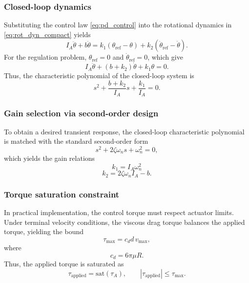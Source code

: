 \documentclass[journal]{IEEEtran}
\begin{document}
\subsubsection{Closed-loop dynamics}

Substituting the control law \eqref{eq:pd_control} into the rotational dynamics in \eqref{eq:rot_dyn_compact} yields
%
\begin{equation}
I_A \ddot{\theta} + b \dot{\theta} = k_1 (\theta_{\mathrm{ref}} - \theta) + k_2 (\dot{\theta}_{\mathrm{ref}} - \dot{\theta}).
\end{equation}
%
For the regulation problem, $\theta_{\mathrm{ref}} = 0$ and $\dot{\theta}_{\mathrm{ref}} = 0$, which give
%
\begin{equation}
I_A \ddot{\theta} + (b + k_2)\dot{\theta} + k_1 \theta = 0.
\end{equation}
%
Thus, the characteristic polynomial of the closed-loop system is
%
\begin{equation}
s^2 + \frac{b + k_2}{I_A}s + \frac{k_1}{I_A} = 0.
\end{equation}
%
\subsubsection{Gain selection via second-order design}

To obtain a desired transient response, the closed-loop characteristic polynomial is matched with the standard second-order form
%
\begin{equation}
s^2 + 2\zeta \omega_n s + \omega_n^2 = 0,
\end{equation}
%
which yields the gain relations
%
\begin{equation}
k_1 = I_A \omega_n^2
\end{equation}
%
\begin{equation}
k_2 = 2\zeta \omega_n I_A - b.
\end{equation}
\subsubsection{Torque saturation constraint}

In practical implementation, the control torque must respect actuator limits. Under terminal velocity conditions, the viscous drag torque balances the applied torque, yielding the bound
%
\begin{equation}
\tau_{\max} = c_d d\, v_{\max},
\end{equation}
%
where
%
\begin{equation}
c_d = 6\pi \mu R.
\end{equation}
%
Thus, the applied torque is saturated as
%
\begin{equation}
\tau_{\mathrm{applied}} = \mathrm{sat}(\tau_A),
\qquad
|\tau_{\mathrm{applied}}| \le \tau_{\max}.
\end{equation}
\end{document}
